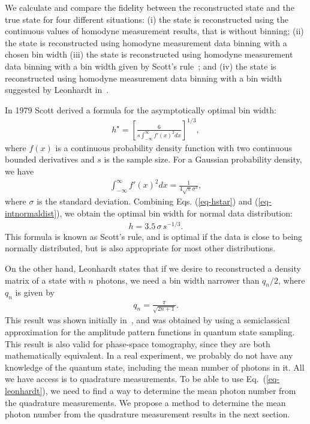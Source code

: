 \documentclass[
reprint,
superscriptaddress,
showpacs,
amsmath,
amssymb,
aps,
pra,
longbibliography
]{revtex4-1}
\begin{document}
We calculate and compare the fidelity between the reconstructed state and the true state for four different situations: (i) the state is reconstructed using the continuous values of homodyne measurement results, that is without binning; (ii) the state is reconstructed using homodyne measurement data binning with a chosen bin width (iii) the state is reconstructed using homodyne measurement data binning with a bin width given by Scott's rule~\cite{Scott2010}; and (iv) the state is reconstructed using homodyne measurement data binning with a bin width suggested by Leonhardt in~\cite{Leonhardt1997}.

In 1979 Scott derived a formula for the asymptotically optimal bin width:
\begin{eqnarray}
h^{\star} = \left[ \frac{6}{s \int_{-\infty}^{\infty} f'(x)^2 dx} \right]^{1/3},
\label{eq-hstar}
\end{eqnarray}
where $f(x)$ is a continuous probability density function with two continuous bounded derivatives and $s$ is the sample size. For a Gaussian probability density, we have
\begin{eqnarray}
\int_{-\infty}^{\infty} f'(x)^2 dx = \frac{1}{4 \sqrt{\pi} \sigma ^3},
\label{eq-intnormaldist}
\end{eqnarray}
where $\sigma$ is the standard deviation. Combining Eqs. (\ref{eq-hstar}) and (\ref{eq-intnormaldist}), we obtain the optimal bin width for normal data distribution:
\begin{eqnarray}
h = 3.5 \, \sigma \, s^{-1/3}.
\end{eqnarray}
This formula is known as Scott's rule, and is optimal if the data is close to being normally distributed, but is also appropriate for most other distributions. 

On the other hand, Leonhardt states that if we desire to reconstructed a density matrix of a state with $n$ photons, we need a bin width narrower than $q_n/2$, where $q_n$ is given by
\begin{eqnarray}
q_n = \frac{\pi}{\sqrt{2 n + 1}}.
\label{eq-leonhardt}
\end{eqnarray}
This result was shown initially in~\cite{Leonhardt1996}, and was obtained by using a semiclassical approximation for the amplitude pattern functions in quantum state
sampling. This result is also valid for phase-space tomography, since they are both 
mathematically equivalent. In a real experiment, we probably do not have any knowledge of the quantum state, including the mean number of photons in it. All we have access is to quadrature measurements. To be able to use Eq.~(\ref{eq-leonhardt}), we need to find a way to determine the mean photon number from the quadrature measurements. We propose a method to determine the mean photon number from the quadrature measurement results in the next section. 
\end{document}
